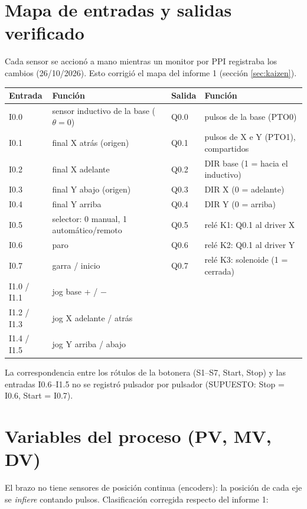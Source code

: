 \section{Mapa de entradas y salidas verificado}
Cada sensor se accionó a mano mientras un monitor por PPI registraba los cambios (26/10/2026). Esto corrigió el mapa del informe 1 (sección \ref{sec:kaizen}).

\begin{center}\small
\begin{tabularx}{\linewidth}{>{\ttfamily}p{1.1cm} >{\raggedright}X >{\ttfamily}p{1.1cm} >{\raggedright\arraybackslash}X}
\toprule
\textbf{\rmfamily Entrada} & \textbf{Función} & \textbf{\rmfamily Salida} & \textbf{Función}\\
\midrule
I0.0 & sensor inductivo de la base ($\theta = 0$) & Q0.0 & pulsos de la base (PTO0)\\
I0.1 & final X atrás (origen) & Q0.1 & pulsos de X e Y (PTO1), compartidos\\
I0.2 & final X adelante & Q0.2 & DIR base (1 = hacia el inductivo)\\
I0.3 & final Y abajo (origen) & Q0.3 & DIR X (0 = adelante)\\
I0.4 & final Y arriba & Q0.4 & DIR Y (0 = arriba)\\
I0.5 & selector: 0 manual, 1 automático/remoto & Q0.5 & relé K1: Q0.1 al driver X\\
I0.6 & paro & Q0.6 & relé K2: Q0.1 al driver Y\\
I0.7 & garra / inicio & Q0.7 & relé K3: solenoide (1 = cerrada)\\
I1.0 / I1.1 & jog base + / $-$ & & \\
I1.2 / I1.3 & jog X adelante / atrás & & \\
I1.4 / I1.5 & jog Y arriba / abajo & & \\
\bottomrule
\end{tabularx}
\end{center}
La correspondencia entre los rótulos de la botonera (S1--S7, Start, Stop) y las entradas I0.6--I1.5 no se registró pulsador por pulsador (SUPUESTO: Stop = I0.6, Start = I0.7).

\section{Variables del proceso (PV, MV, DV)}
El brazo no tiene sensores de posición continua (encoders): la posición de cada eje se \emph{infiere} contando pulsos. Clasificación corregida respecto del informe 1:


